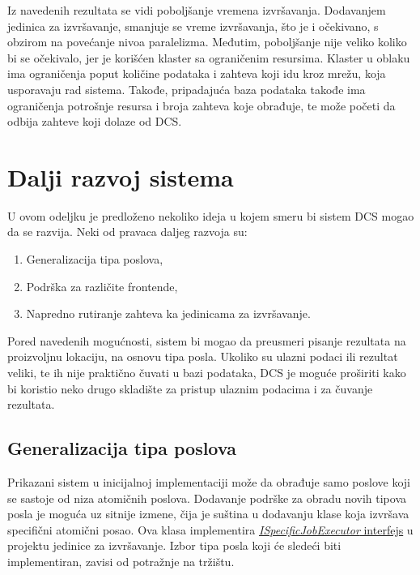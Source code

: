 \documentclass[12pt,oneside]{memoir}
\begin{document}
Iz navedenih rezultata se vidi poboljšanje vremena izvršavanja. Dodavanjem jedinica za izvršavanje, smanjuje se vreme izvršavanja, što je i očekivano, s obzirom na povećanje nivoa paralelizma. Međutim, poboljšanje nije veliko koliko bi se očekivalo, jer je korišćen klaster sa ograničenim resursima. Klaster u oblaku ima ograničenja poput količine podataka i zahteva koji idu kroz mrežu, koja usporavaju rad sistema. Takođe, pripadajuća baza podataka takođe ima ograničenja potrošnje resursa i broja zahteva koje obrađuje, te može početi da odbija zahteve koji dolaze od DCS.

\section{Dalji razvoj sistema}

U ovom odeljku je predloženo nekoliko ideja u kojem smeru bi sistem DCS mogao da se razvija. Neki od pravaca daljeg razvoja su:
\begin{enumerate}
\item Generalizacija tipa poslova,
\item Podrška za različite frontende,
\item Napredno rutiranje zahteva ka jedinicama za izvršavanje.
\end{enumerate}

Pored navedenih mogućnosti, sistem bi mogao da preusmeri pisanje rezultata na proizvoljnu lokaciju, na osnovu tipa posla. Ukoliko su ulazni podaci ili rezultat veliki, te ih nije praktično čuvati u bazi podataka, DCS je moguće proširiti kako bi koristio neko drugo skladište za pristup ulaznim podacima i za čuvanje rezultata.

\subsection{Generalizacija tipa poslova}

Prikazani sistem u inicijalnoj implementaciji može da obrađuje samo poslove koji se sastoje od niza atomičnih poslova. Dodavanje podrške za obradu novih tipova posla je moguća uz sitnije izmene, čija je suština u dodavanju klase koja izvršava specifični atomični posao. Ova klasa implementira \href{https://github.com/milana-kovacevic/DistributedComputationSystem/blob/main/src/ComputeNode/Executors/ISpecificJobExecutor.cs}{\emph{ISpecificJobExecutor} interfejs} u projektu jedinice za izvršavanje. Izbor tipa posla koji će sledeći biti implementiran, zavisi od potražnje na tržištu.
\end{document}
